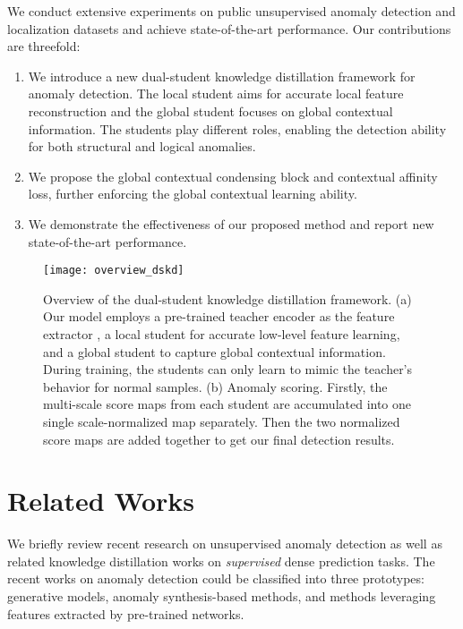 \documentclass[10pt,twocolumn,letterpaper]{article}
\begin{document}
We conduct extensive experiments on public unsupervised anomaly detection and localization datasets and achieve state-of-the-art performance. Our contributions are threefold:
\begin{enumerate}
    \item We introduce a new dual-student knowledge distillation framework for anomaly detection. The local student aims for accurate local feature reconstruction and the global student focuses on global contextual information. The students play different roles, enabling the detection ability for both structural and logical anomalies.
    \item We propose the global contextual condensing block and contextual affinity loss, further enforcing the global contextual learning ability.
    \item We demonstrate the effectiveness of our proposed method and report new state-of-the-art performance.
\end{enumerate}















\begin{figure*}
  \centering
    \texttt{[image: overview\_dskd]}

  \caption{Overview of the dual-student knowledge distillation framework. (a) Our model employs a pre-trained teacher encoder as the feature extractor , a local student for accurate low-level feature learning, and a global student to capture global contextual information. During training, the students can only learn to mimic the teacher's behavior for normal samples. (b) Anomaly scoring. Firstly, the multi-scale score maps from each student are accumulated into one single scale-normalized map separately. Then the two normalized score maps are added together to get our final detection results.}
    \label{fig_overview}
\end{figure*}

\section{Related Works}
\label{related work}
We briefly review recent research on unsupervised anomaly detection as well as related knowledge distillation works on \textit{supervised} dense prediction tasks. The recent works on 
anomaly detection could be classified into three prototypes: generative models, anomaly synthesis-based methods, and methods leveraging features extracted by pre-trained networks. 
\end{document}
